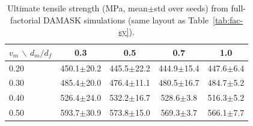 \begin{table}[t]
  \centering
  \caption{Ultimate tensile strength (MPa, mean$\pm$std over seeds) from full-factorial DAMASK simulations (same layout as Table~\ref{tab:fac-sy}).}
  \label{tab:fac-uts}
  \begin{tabular}{l|cccc}
    \toprule
    $v_m$ $\backslash$ $d_m/d_f$ & 0.3 & 0.5 & 0.7 & 1.0 \\
    \midrule
    0.20 & 450.1$\pm$20.2 & 445.5$\pm$22.2 & 444.9$\pm$15.4 & 447.6$\pm$6.4 \\
    0.30 & 485.4$\pm$20.0 & 476.4$\pm$11.1 & 480.5$\pm$16.7 & 484.7$\pm$5.2 \\
    0.40 & 526.4$\pm$24.0 & 532.2$\pm$16.7 & 528.6$\pm$3.8 & 516.3$\pm$5.2 \\
    0.50 & 593.7$\pm$30.9 & 573.8$\pm$15.0 & 569.3$\pm$3.7 & 566.1$\pm$7.7 \\
    \bottomrule
  \end{tabular}
\end{table}